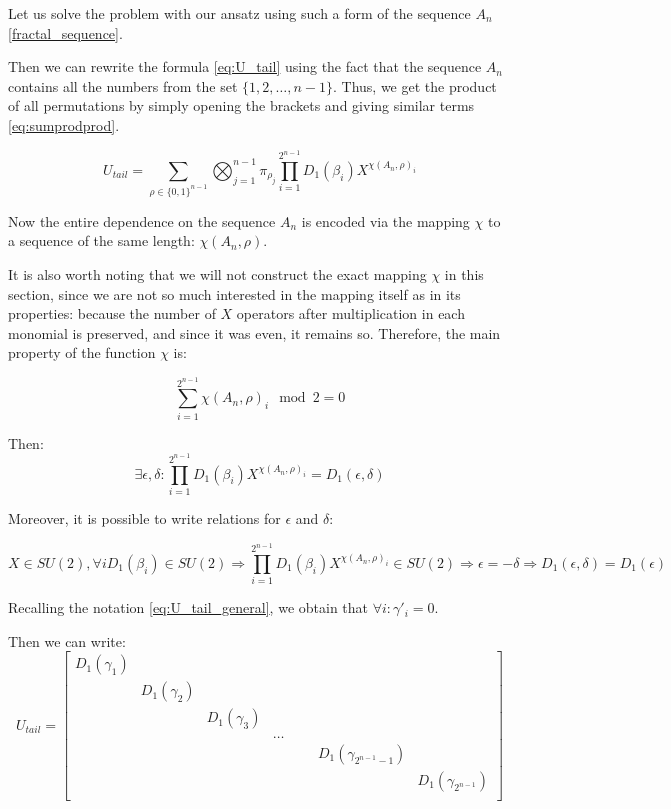 \documentclass[a4paper, openany, 12pt]{article}
\theoremstyle{remark}
\theoremstyle{definition}
\begin{document}
Let us solve the problem with our ansatz using such a form of the sequence $A_n$ \eqref{fractal_sequence}.

Then we can rewrite the formula \eqref{eq:U_tail} using the fact that the sequence $A_n$ contains all the numbers from the set $\{1,2,\dots,n-1\}$. Thus, we get the product of all permutations by simply opening the brackets and giving similar terms \eqref{eq:sumprodprod}.

\begin{equation}
    U_{tail} = \sum_{\rho\in \{0,1\}^{n-1}} \bigotimes_{j = 1}^{n-1} \pi_{\rho_{j}}\prod_{i=1}^{2^{n-1}} D_1(\beta_i)X^{\chi(A_n,\rho)_i}
    \label{eq:sumprodprod}
\end{equation}

Now the entire dependence on the sequence $A_n$ is encoded via the mapping $\chi$ to a sequence of the same length: $\chi(A_n,\rho)$.

It is also worth noting that we will not construct the exact mapping $\chi$ in this section, since we are not so much interested in the mapping itself as in its properties: because the number of $X$ operators after multiplication in each monomial is preserved, and since it was even, it remains so. Therefore, the main property of the function $\chi$ is:


\begin{equation}
    \sum_{i=1}^{2^{n-1}}\chi(A_n,\rho)_i\mod2 = 0
\end{equation}

Then:
\begin{equation}
    \exists \epsilon, \delta: \prod_{i=1}^{2^{n-1}} D_1(\beta_i)X^{\chi(A_n, \rho)_i} = D_1(\epsilon,\delta)
\end{equation}

Moreover, it is possible to write relations for $\epsilon$ and $\delta$:

\begin{equation}
    X\in SU(2), \forall i D_1(\beta_i) \in SU(2) \Rightarrow \prod_{i=1}^{2^{n-1}} D_1(\beta_i)X^{\chi(A_n,\rho)_i} \in SU(2) \Rightarrow \epsilon = -\delta \Rightarrow D_1(\epsilon,\delta) = D_1(\epsilon)
\end{equation}

Recalling the notation \eqref{eq:U_tail_general}, we obtain that $\forall i: \gamma'_i = 0$.


Then we can write:
\begin{equation}
\label{eq:U_tail_block_diagonal}
U_{tail} = \begin{bmatrix}
D_1(\gamma_1) & & & & &  \\
& D_1(\gamma_2) & & & & \\
& & D_1(\gamma_3) & & & \\
& & & \dotsc & & \\
& & & & & & D_1(\gamma_{2^{n-1}-1}) & \\
& & & & & & & D_1(\gamma_{2^{n-1}}) \\
\end{bmatrix}
\end{equation}
\end{document}
